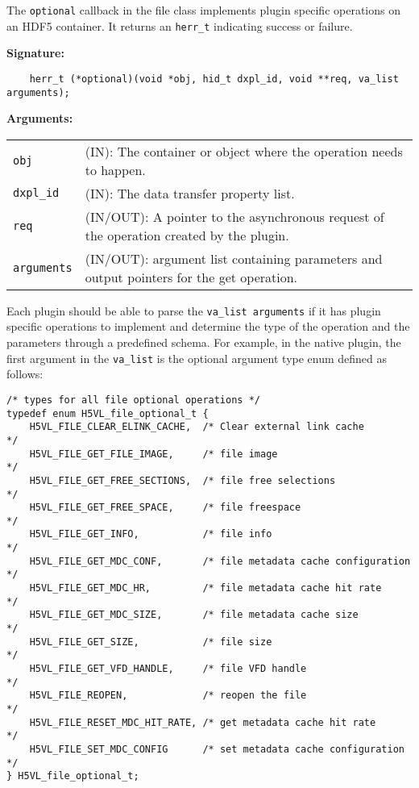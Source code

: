 The \texttt{optional} callback in the file class implements plugin specific operations on an HDF5 container. It returns an 
\texttt{herr\_t} indicating success or failure. \bigskip
\begin{mdframed}[style=bgbox] 
\textbf{Signature:}
\begin{lstlisting}
    herr_t (*optional)(void *obj, hid_t dxpl_id, void **req, va_list arguments);
\end{lstlisting}

\textbf{Arguments:}\\
\begin{tabular}{l p{10cm}}
  \texttt{obj} & (IN): The container or object where the operation needs to happen.\\
  \texttt{dxpl\_id} & (IN): The data transfer property list.\\
  \texttt{req} & (IN/OUT): A pointer to the asynchronous request of the operation created by the plugin.\\
  \texttt{arguments} & (IN/OUT): argument list containing parameters and output pointers for the get operation. \\
\end{tabular}
\end{mdframed}

Each plugin should be able to parse the \texttt{va\_list arguments} if it has plugin specific operations to implement and determine the type of the operation and the parameters through a predefined schema. For example, in the native plugin, the first argument in the \texttt{va\_list} is the optional argument type enum defined as follows:

\begin{lstlisting}
/* types for all file optional operations */
typedef enum H5VL_file_optional_t {
    H5VL_FILE_CLEAR_ELINK_CACHE,  /* Clear external link cache         */
    H5VL_FILE_GET_FILE_IMAGE,     /* file image                        */
    H5VL_FILE_GET_FREE_SECTIONS,  /* file free selections              */
    H5VL_FILE_GET_FREE_SPACE,     /* file freespace                    */
    H5VL_FILE_GET_INFO,           /* file info                         */
    H5VL_FILE_GET_MDC_CONF,       /* file metadata cache configuration */
    H5VL_FILE_GET_MDC_HR,         /* file metadata cache hit rate      */
    H5VL_FILE_GET_MDC_SIZE,       /* file metadata cache size          */
    H5VL_FILE_GET_SIZE,           /* file size                         */
    H5VL_FILE_GET_VFD_HANDLE,     /* file VFD handle                   */
    H5VL_FILE_REOPEN,             /* reopen the file                   */
    H5VL_FILE_RESET_MDC_HIT_RATE, /* get metadata cache hit rate       */
    H5VL_FILE_SET_MDC_CONFIG      /* set metadata cache configuration  */
} H5VL_file_optional_t;
\end{lstlisting}

